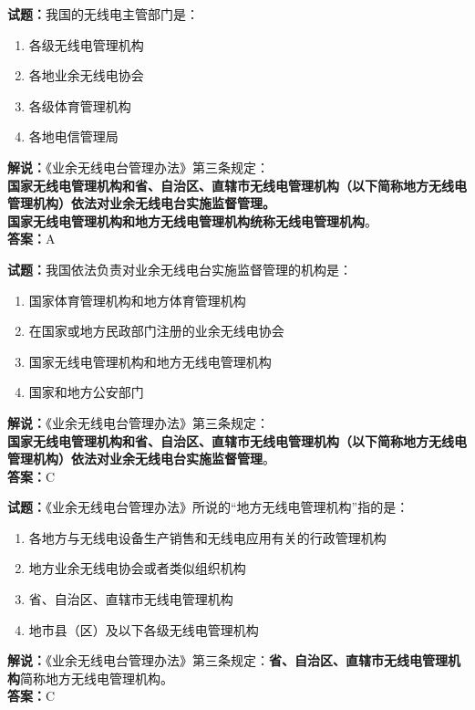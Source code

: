 \documentclass{ctexbook}
\begin{document}
\vspace{1em}

\textbf{试题：}我国的无线电主管部门是：
\begin{enumerate}[leftmargin=3em]
  \item 各级无线电管理机构
  \item 各地业余无线电协会
  \item 各级体育管理机构
  \item 各地电信管理局
\end{enumerate}
\noindent\textbf{解说：}《业余无线电台管理办法》第三条规定：\\\textbf{国家无线电管理机构和省、自治区、直辖市无线电管理机构（以下简称地方无线电管理机构）依法对业余无线电台实施监督管理。\\
  国家无线电管理机构和地方无线电管理机构统称无线电管理机构}。\\\noindent\textbf{答案：}A

\vspace{1em}

\textbf{试题：}我国依法负责对业余无线电台实施监督管理的机构是：
\begin{enumerate}[leftmargin=3em]
  \item 国家体育管理机构和地方体育管理机构
  \item 在国家或地方民政部门注册的业余无线电协会
  \item 国家无线电管理机构和地方无线电管理机构
  \item 国家和地方公安部门
\end{enumerate}
\noindent\textbf{解说：}《业余无线电台管理办法》第三条规定：\\\textbf{国家无线电管理机构和省、自治区、直辖市无线电管理机构（以下简称地方无线电管理机构）依法对业余无线电台实施监督管理}。\\\noindent\textbf{答案：}C

\vspace{1em}

\textbf{试题：}《业余无线电台管理办法》所说的“地方无线电管理机构”指的是：
\begin{enumerate}[leftmargin=3em]
  \item 各地方与无线电设备生产销售和无线电应用有关的行政管理机构
  \item 地方业余无线电协会或者类似组织机构
  \item 省、自治区、直辖市无线电管理机构
  \item 地市县（区）及以下各级无线电管理机构
\end{enumerate}
\noindent\textbf{解说：}《业余无线电台管理办法》第三条规定：\textbf{省、自治区、直辖市无线电管理机构}简称地方无线电管理机构。\\\noindent\textbf{答案：}C
\end{document}
